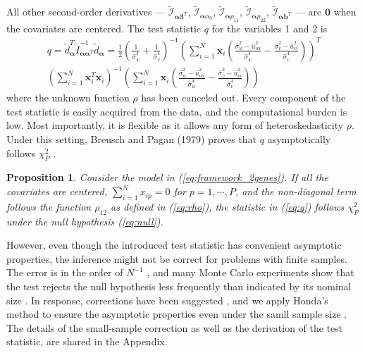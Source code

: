 \documentclass[aap, preprint]{imsart}
\numberwithin{equation}{section}
\theoremstyle{plain}
\newtheorem{prop}{Proposition}
\begin{document}
All other second-order derivatives --- 
$\tilde{\mathcal{I}}_{\bm{\alpha}\bm{\beta}^T}$,
$\tilde{\mathcal{I}}_{\bm{\alpha}\alpha_0}$,
$\tilde{\mathcal{I}}_{\bm{\alpha}\rho_{11}}$,
$\tilde{\mathcal{I}}_{\bm{\alpha}\rho_{22}}$,
$\tilde{\mathcal{I}}_{\bm{\alpha}\bm{b}^T}$ --- are $\bm{0}$ when the covariates are centered. The test statistic $q$ for the variables 1 and 2 is
\begin{equation}
    \begin{multlined}
    q = \tilde{d}_{\bm{\alpha}}^T \tilde{I}_{\bm{\alpha}\bm{\alpha}^T}^{-1}
    \tilde{d}_{\bm{\alpha}}
    =\frac{1}{2}\left( \frac{1}{\hat{\sigma}_w^4}+\frac{1}{\hat{\sigma}_v^4}\right)^{-1}
\left(\sum_{i=1}^{N} \bm{x}_{i} 
\left(
\frac{\hat{\sigma}_w^2-\hat{u}_{wi}^2}{\hat{\sigma}_w^4}- \frac{\hat{\sigma}_v^2-\hat{u}_{vi}^2}{\hat{\sigma}_v^4}
\right)
\right)^T \\
\left( \sum_{i=1}^{N} \bm{x}_i^T \bm{x}_i \right)^{-1}
\left(
\sum_{i=1}^{N} \bm{x}_{i} 
\left(
\frac{\hat{\sigma}_w^2-\hat{u}_{wi}^2}{\hat{\sigma}_w^4}- \frac{\hat{\sigma}_v^2-\hat{u}_{vi}^2}{\hat{\sigma}_v^4}
\right)
\right)
    \end{multlined}
    \label{eq:q}
\end{equation}
where the unknown function $\rho$ has been canceled out. Every component of the test statistic is easily acquired from the data, and the computational burden is low. Most importantly, it is flexible as it allows any form of heteroskedasticity $\rho$. Under this setting, Breusch and Pagan (1979)  proves that $q$ asymptotically follows $\chi_{P}^2$ \cite{breusch1979simple}.
\begin{prop}
Consider the model in (\ref{eq:framework_2genes}). If all the covariates are centered, $\sum_{i=1}^{N} x_{ip} = 0$ for $p = 1, \cdots, P$, and the non-diagonal term follows the function $\rho_{12}$ as defined in (\ref{eq:rho}), the statistic in (\ref{eq:q}) follows $\chi_P^2$ under the null hypothesis (\ref{eq:null}). 
\label{theorem:q}
\end{prop}
However, even though the introduced test statistic has convenient asymptotic properties, the inference might not be correct for problems with finite samples. The error is in the order of $N^{-1}$ \cite{harris1985asymptotic}, and many Monte Carlo experiments show that the test rejects the null hypothesis less frequently than indicated by its nominal size \cite{ godfrey1978testing, griffiths1986monte,honda1988size} . In response, corrections have been suggested \cite{cribari2001monotonic, harris1985asymptotic, honda1988size}, and we apply Honda's method to ensure the asymptotic properties even under the samll sample size \cite{honda1988size}. The details of the small-sample correction as well as the derivation of the test statistic, are shared in the Appendix.\\
\end{document}
